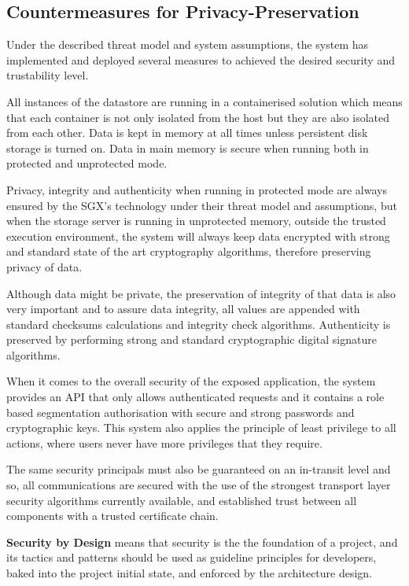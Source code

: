 \subsection{Countermeasures for Privacy-Preservation}
\label{ssec:contermeaseures_for_privacy_preservation}

Under the described threat model and system assumptions, the system has implemented and deployed several measures to achieved the desired security and trustability level.

All instances of the datastore are running in a containerised solution which means that each container is not only isolated from the host but they are also isolated from each other. Data is kept in memory at all times unless persistent disk storage is turned on. Data in main memory is secure when running both in protected and unprotected mode. 

Privacy, integrity and authenticity when running in protected mode are always ensured by the \gls{SGX}'s technology under their threat model and assumptions, but when the storage server is running in unprotected memory, outside the trusted execution environment, the system will always keep data encrypted with strong and standard state of the art cryptography algorithms, therefore preserving privacy of data. 

Although data might be private, the preservation of integrity of that data is also very important and to assure data integrity, all values are appended with standard checksums calculations and integrity check algorithms. Authenticity is preserved by performing strong and standard cryptographic digital signature algorithms.

When it comes to the overall security of the exposed application, the system provides an \gls{API} that only allows authenticated requests and it contains a role based segmentation authorisation with secure and strong passwords and cryptographic keys. This system also applies the principle of least privilege \cite{polp:1} to all actions, where users never have more privileges that they require.

The same security principals must also be guaranteed on an in-transit level and so, all communications are secured with the use of the strongest transport layer security algorithms currently available, and established trust between all components with a trusted certificate chain.

\textbf{Security by Design} means that security is the the foundation of a project, and its tactics and patterns should be used as guideline principles for developers, baked into the project initial state, and enforced by the architecture design.

